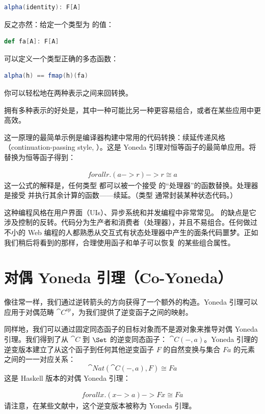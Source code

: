 \begin{lstlisting}[language=Scala]
alpha(identity): F[A]
\end{lstlisting}
反之亦然：给定一个类型为  的值：

\begin{lstlisting}[language=Scala]
def fa[A]: F[A]
\end{lstlisting}
可以定义一个类型正确的多态函数：

\begin{lstlisting}[language=Scala]
alpha(h) == fmap(h)(fa)
\end{lstlisting}
你可以轻松地在两种表示之间来回转换。

拥有多种表示的好处是，其中一种可能比另一种更容易组合，或者在某些应用中更高效。

这一原理的最简单示例是编译器构建中常用的代码转换：续延传递风格（continuation-passing style, ）。这是 Yoneda 引理对恒等函子的最简单应用。将  替换为恒等函子得到：

\begin{align}
  forall r . (a -> r) -> r \ensuremath{\cong} a
\end{align}
这一公式的解释是，任何类型  都可以被一个接受  的“处理器”的函数替换。处理器是接受  并执行其余计算的函数——续延。（类型  通常封装某种状态代码。）

这种编程风格在用户界面（UIs）、异步系统和并发编程中非常常见。 的缺点是它涉及控制的反转。代码分为生产者和消费者（处理器），并且不易组合。任何做过不小的 Web 编程的人都熟悉从交互式有状态处理器中产生的面条代码噩梦。正如我们稍后将看到的那样，合理使用函子和单子可以恢复  的某些组合属性。

\section{对偶 Yoneda 引理（Co-Yoneda）}

像往常一样，我们通过逆转箭头的方向获得了一个额外的构造。Yoneda 引理可以应用于对偶范畴 $\cat{C}^\mathit{op}$，为我们提供了逆变函子之间的映射。

同样地，我们可以通过固定同态函子的目标对象而不是源对象来推导对偶 Yoneda 引理。我们得到了从 $\cat{C}$ 到 $\Set$ 的逆变同态函子：
$\cat{C}(-, a)$。Yoneda 引理的逆变版本建立了从这个函子到任何其他逆变函子 $F$ 的自然变换与集合 $F a$ 的元素之间的一一对应关系：
\[\cat{Nat}(\cat{C}(-, a), F) \cong F a\]
这是 Haskell 版本的对偶 Yoneda 引理：

\begin{align}
  forall x . (x -> a) -> F x \ensuremath{\cong} F a
\end{align}
请注意，在某些文献中，这个逆变版本被称为 Yoneda 引理。

